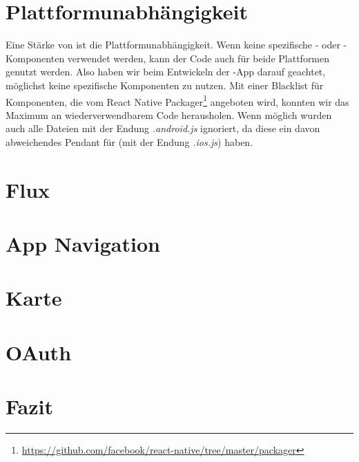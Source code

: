 \section{Plattformunabhängigkeit}
Eine Stärke von  ist die Plattformunabhängigkeit. 
Wenn keine spezifische - oder -Komponenten verwendet werden, kann der Code auch für beide Plattformen genutzt werden.
Also haben wir beim Entwickeln der -App darauf geachtet, möglichst keine spezifische Komponenten zu nutzen. 
Mit einer Blacklist für Komponenten, die vom React Native Packager\footnote{\url{https://github.com/facebook/react-native/tree/master/packager}} angeboten wird, konnten wir das Maximum an wiederverwendbarem Code herausholen. 
Wenn möglich wurden auch alle Dateien mit der Endung \textit{.android.js} ignoriert, da diese ein davon abweichendes Pendant für  (mit der Endung \textit{.ios.js}) haben.

\section{Flux}

\section{App Navigation}

\section{Karte}

\section{OAuth}

\section{Fazit}
